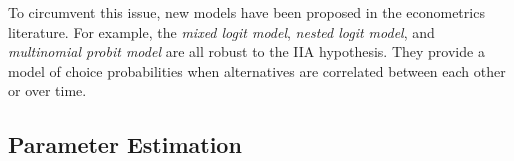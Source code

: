 To circumvent this issue, new models have been proposed in the econometrics literature.
For example, the \emph{mixed logit model}, \emph{nested logit model}, and \emph{multinomial probit model} are all robust to the IIA hypothesis.
They provide a model of choice probabilities when alternatives are correlated between each other or over time.

\subsection{Parameter Estimation}
